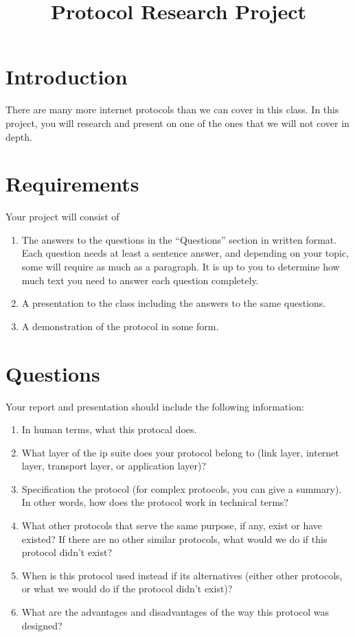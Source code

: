 \documentclass{article}
\title{Protocol Research Project}
\begin{document}
\maketitle
\section{Introduction}
There are many more internet protocols than we can cover in this class.  In this project, you will research and present on one of the ones that we will not cover in depth.

\section{Requirements}
Your project will consist of 
\begin{enumerate}
\item The answers to the questions in the ``Questions'' section in written format.  Each question needs at least a sentence answer, and depending on your topic, some will require as much as a paragraph.  It is up to you to determine how much text you need to answer each question completely.
\item A presentation to the class including the answers to the same questions.
\item A demonstration of the protocol in some form. 
\end{enumerate}

\hspace{10mm}

\section{Questions}
Your report and presentation should include the following information:
\begin{enumerate}
\item In human terms, what this protocal does.
\item What layer of the ip suite does your protocol belong to (link layer, internet layer, transport layer, or application layer)?
\item Specification the protocol (for complex protocols, you can give a summary).  In other words, how does the protocol work in technical terms?
\item What other protocols that serve the same purpose, if any, exist or have existed?  If there are no other similar protocols, what would we do if this protocol didn't exist?
\item When is this protocol used instead if its alternatives (either other protocols, or what we would do if the protocol didn't exist)?
\item What are the advantages and disadvantages of the way this protocol was designed?
\end{enumerate}
\end{document}
